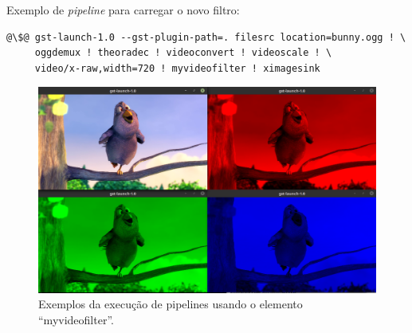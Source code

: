 Exemplo de \emph{pipeline} para carregar o novo filtro: 
\begin{lstlisting}[style=command]
@\$@ gst-launch-1.0 --gst-plugin-path=. filesrc location=bunny.ogg ! \
     oggdemux ! theoradec ! videoconvert ! videoscale ! \
     video/x-raw,width=720 ! myvideofilter ! ximagesink
\end{lstlisting}

\begin{figure}[H]
  \centering
  \includegraphics[scale=.250]{pics/myvideofilter.png}
  \caption{Exemplos da execução de pipelines usando o elemento
           ``myvideofilter''.}
  \label{fig:bunny_myvideofilter}
\end{figure}

